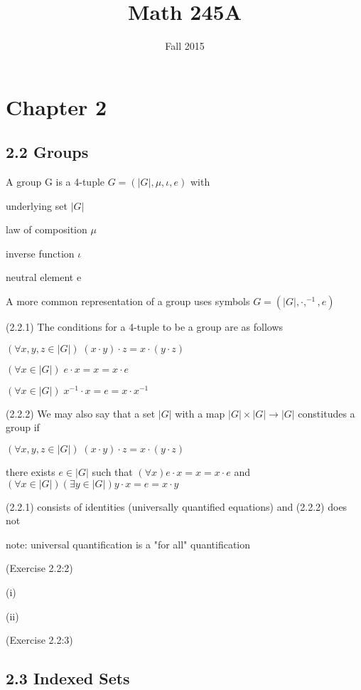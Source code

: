\documentclass[12pt]{article}
\title{Math 245A}
\date{\normalsize Fall 2015}
\begin{document}
\maketitle

\section{Chapter 2}

\subsection{2.2 Groups}

A group G is a 4-tuple $G = (|G|, \mu, \iota, e)$ with

underlying set $|G|$

law of composition $\mu$

inverse function $\iota$

neutral element e

\noindent
A more common representation of a group uses symbols $G = (|G|, \cdot, ^{-1}, e)$

\noindent
(2.2.1) The conditions for a 4-tuple to be a group are as follows

$(\forall x, y , z \in |G|)\;(x \cdot y) \cdot z =  x \cdot (y \cdot z)$

$(\forall x \in |G|)\;e \cdot x = x = x \cdot e$

$(\forall x \in |G|)\;x^{-1} \cdot x = e = x \cdot x^{-1}$

\noindent
(2.2.2) We may also say that a set $|G|$ with a map $|G| \times |G| \to |G|$ constitudes a group if

$(\forall x, y , z \in |G|)\;(x \cdot y) \cdot z =  x \cdot (y \cdot z)$

there exists $e \in |G|$ such that $(\forall x) e \cdot x = x = x \cdot e$ and $(\forall x \in |G|)(\exists y \in |G|) y \cdot x = e = x \cdot y$

\noindent
(2.2.1) consists of identities (universally quantified equations) and (2.2.2) does not

note: universal quantification is a "for all" quantification

\noindent
(Exercise 2.2:2)

(i)

(ii)

\noindent
(Exercise 2.2:3)

\noindent

\subsection{2.3 Indexed Sets}
\end{document}
